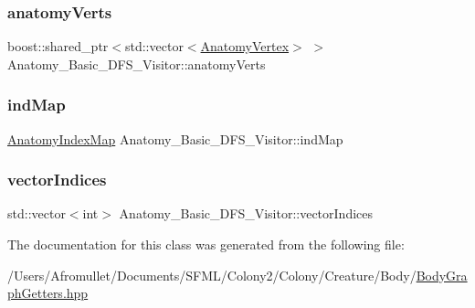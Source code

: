 \subsubsection{\texorpdfstring{anatomy\+Verts}{anatomyVerts}}
{\footnotesize\ttfamily boost\+::shared\+\_\+ptr$<$std\+::vector$<$\mbox{\hyperlink{_body_graph_8hpp_aeb92fc7b3eed88cf25a4fc7b708a66cf}{Anatomy\+Vertex}}$>$ $>$ Anatomy\+\_\+\+Basic\+\_\+\+D\+F\+S\+\_\+\+Visitor\+::anatomy\+Verts\hspace{0.3cm}{\ttfamily [private]}}

\mbox{\label{class_anatomy___basic___d_f_s___visitor_a14840f6f0ba018b260db5d73e40fb326}} 
\subsubsection{\texorpdfstring{ind\+Map}{indMap}}
{\footnotesize\ttfamily \mbox{\hyperlink{_body_graph_8hpp_a9b727b123ee9682a6fc73a7785727450}{Anatomy\+Index\+Map}} Anatomy\+\_\+\+Basic\+\_\+\+D\+F\+S\+\_\+\+Visitor\+::ind\+Map\hspace{0.3cm}{\ttfamily [private]}}

\mbox{\label{class_anatomy___basic___d_f_s___visitor_a8e5871c69ac1e7ab736a2f31f3d35657}} 
\subsubsection{\texorpdfstring{vector\+Indices}{vectorIndices}}
{\footnotesize\ttfamily std\+::vector$<$int$>$ Anatomy\+\_\+\+Basic\+\_\+\+D\+F\+S\+\_\+\+Visitor\+::vector\+Indices\hspace{0.3cm}{\ttfamily [private]}}



The documentation for this class was generated from the following file\+:\begin{DoxyCompactItemize}
\item 
/\+Users/\+Afromullet/\+Documents/\+S\+F\+M\+L/\+Colony2/\+Colony/\+Creature/\+Body/\mbox{\hyperlink{_body_graph_getters_8hpp}{Body\+Graph\+Getters.\+hpp}}\end{DoxyCompactItemize}
